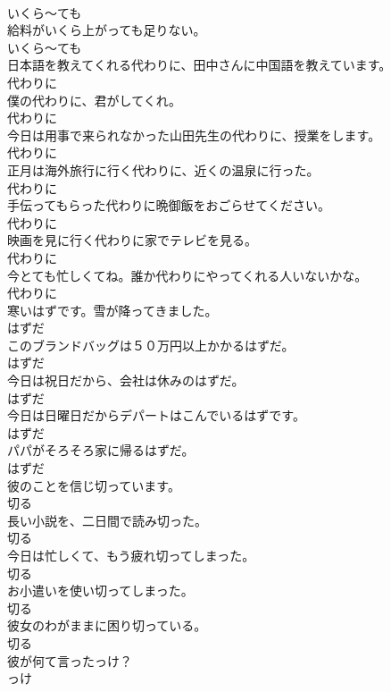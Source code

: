 \documentclass[8pt]{extreport}
\begin{document}
\begin{CJK}{UTF8}{min}
\\	いくら～ても
\\	給料がいくら上がっても足りない。	
\\	いくら～ても
\\	日本語を教えてくれる代わりに、田中さんに中国語を教えています。	
\\	代わりに
\\	僕の代わりに、君がしてくれ。	
\\	代わりに
\\	今日は用事で来られなかった山田先生の代わりに、授業をします。	
\\	代わりに
\\	正月は海外旅行に行く代わりに、近くの温泉に行った。	
\\	代わりに
\\	手伝ってもらった代わりに晩御飯をおごらせてください。	
\\	代わりに
\\	映画を見に行く代わりに家でテレビを見る。	
\\	代わりに
\\	今とても忙しくてね。誰か代わりにやってくれる人いないかな。	
\\	代わりに
\\	寒いはずです。雪が降ってきました。	
\\	はずだ
\\	このブランドバッグは５０万円以上かかるはずだ。	
\\	はずだ
\\	今日は祝日だから、会社は休みのはずだ。	
\\	はずだ
\\	今日は日曜日だからデパートはこんでいるはずです。	
\\	はずだ
\\	パパがそろそろ家に帰るはずだ。	
\\	はずだ
\\	彼のことを信じ切っています。	
\\	切る
\\	長い小説を、二日間で読み切った。	
\\	切る
\\	今日は忙しくて、もう疲れ切ってしまった。	
\\	切る
\\	お小遣いを使い切ってしまった。	
\\	切る
\\	彼女のわがままに困り切っている。	
\\	切る
\\	彼が何て言ったっけ？	
\\	っけ

\end{CJK}
\end{document}
